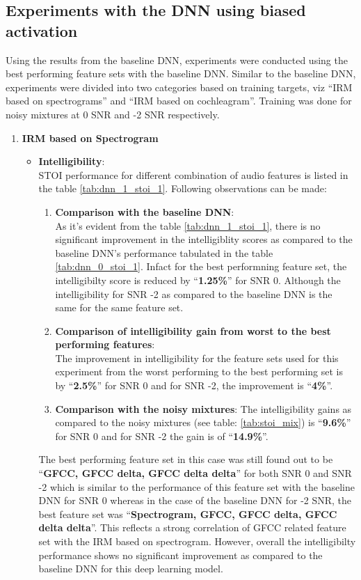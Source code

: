 \subsection{Experiments with the DNN using biased activation}
Using the results from the baseline DNN, experiments were conducted using the best performing feature sets with the baseline DNN. Similar to the baseline DNN, experiments were divided into two categories based on training targets, viz “IRM based on spectrograms” and “IRM based on cochleagram”. Training was done for noisy mixtures at 0 SNR and -2 SNR respectively.
\begin{enumerate}
\item \textbf{IRM based on Spectrogram}
\begin{itemize}
\item \textbf{Intelligibility}:\\
STOI performance for different combination of audio features is listed in
the table \ref{tab:dnn_1_stoi_1}. Following observations can be made:\\
\begin{enumerate}
\item \textbf{Comparison with the baseline DNN}:\\
As it's evident from the table \ref{tab:dnn_1_stoi_1}, there is no significant improvement in the intelligiblity scores as compared to the baseline DNN's performance tabulated in the table \ref{tab:dnn_0_stoi_1}. Infact for the best performning feature set, the intelligibilty score is reduced by \enquote{\textbf{1.25\%}} for SNR 0. Although the intelligibility for SNR -2 as compared to the baseline DNN is the same for the same feature set.
\item \textbf{Comparison of intelligibility gain from worst to the best performing features}:\\
The improvement in intelligibility for the feature sets used for this experiment from the worst performing to the best performing set is by \enquote{\textbf{2.5\%}} for SNR 0 and for SNR -2, the improvement is \enquote{\textbf{4\%}}.
\item \textbf{Comparison with the noisy mixtures}:
The intelligibility gains as compared to the noisy mixtures (see table: \ref{tab:stoi_mix}) is \enquote{\textbf{9.6\%}} for SNR 0 and for SNR -2 the gain is of \enquote{\textbf{14.9\%}}.
\end{enumerate}
The best performing feature set in this case was still found out to be \enquote{\textbf{GFCC, GFCC delta, GFCC delta delta}} for both SNR 0 and SNR -2 which is similar to the performance of this feature set with the baseline DNN for SNR 0 whereas in the case of the baseline DNN for -2 SNR, the best feature set was \enquote{\textbf{Spectrogram, GFCC, GFCC delta, GFCC delta delta}}. This reflects a strong correlation of GFCC related feature set with the IRM based on spectrogram. However, overall the intelligibilty performance shows no significant improvement as compared to the baseline DNN for this deep learning model.


\end{itemize}
\end{enumerate}
